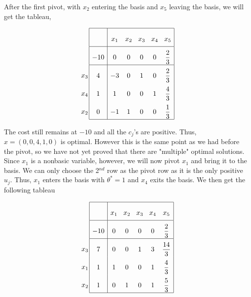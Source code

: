 After the first pivot, with $x_2$ entering the basis and $x_5$ leaving the basis, we will get the tableau,

$$
\arraycolsep=1.4pt\def\arraystretch{2.2}
\begin{array}{c}
\\
 \\
x_3 \\
x_4 \\ 
x_2 \\
\end{array}
\arraycolsep=4.4pt\def\arraystretch{2.2}
\begin{array}{|c|ccccc|}
    \hline
    & x_1 & x_2 & x_3 & x_4 & x_5\\ \hline 
 -10 & 0 & 0 & 0 & 0 & \dfrac{2}{3}\\ \hline
  4 & -3 & 0 & 1 & 0 & \dfrac{2}{3}\\
  1 & 1 & 0 & 0 & 1 & \dfrac{4}{3}\\
  0 & -1 & 1 & 0 & 0 & \dfrac{1}{3}\\\hline
\end{array}
$$

The cost still remains at $-10$ and all the $c_j$'s are positive. Thus, $x = (0,0,4,1,0)$ is optimal. However this is the same point as we had before the pivot, so we have not yet proved that there are "multiple" optimal solutions. \\

Since $x_1$ is a nonbasic variable, however, we will now pivot $x_1$ and bring it to the basis. We can only choose the 2$^{nd}$ row as the pivot row as it is the only positive $u_j$. Thus, $x_1$ enters the basis with $\theta^* = 1$ and $x_4$ exits the basis. We then get the following tableau

$$
\arraycolsep=1.4pt\def\arraystretch{2.2}
\begin{array}{c}
\\
 \\
x_3 \\
x_1 \\ 
x_2 \\
\end{array}
\arraycolsep=4.4pt\def\arraystretch{2.2}
\begin{array}{|c|ccccc|}
    \hline
    & x_1 & x_2 & x_3 & x_4 & x_5\\ \hline 
 -10 & 0 & 0 & 0 & 0 & \dfrac{2}{3}\\ \hline
  7 & 0 & 0 & 1 & 3 & \dfrac{14}{3}\\
  1 & 1 & 0 & 0 & 1 & \dfrac{4}{3}\\
  1 & 0 & 1 & 0 & 1 & \dfrac{5}{3}\\\hline
\end{array}
$$

